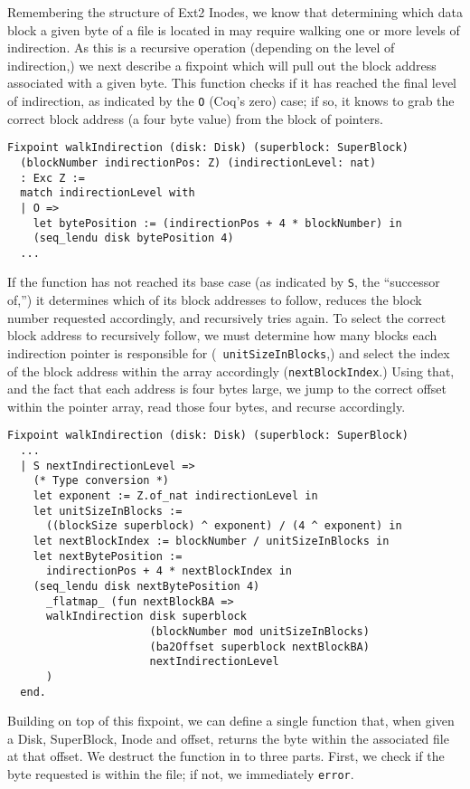 \documentclass[nocopyrightspace]{sigplanconf}
\begin{document}
Remembering the structure of Ext2 Inodes, we know that determining which data
block a given byte of a file is located in may require walking one or more
levels of indirection. As this is a recursive operation (depending on the
level of indirection,) we next describe a fixpoint which will pull out the
block address associated with a given byte. This function checks if it has
reached the final level of indirection, as indicated by the {\tt O} (Coq's
zero) case; if so, it knows to grab the correct block address (a four byte
value) from the block of pointers.

\begin{lstlisting}
Fixpoint walkIndirection (disk: Disk) (superblock: SuperBlock)
  (blockNumber indirectionPos: Z) (indirectionLevel: nat) 
  : Exc Z :=
  match indirectionLevel with
  | O => 
    let bytePosition := (indirectionPos + 4 * blockNumber) in
    (seq_lendu disk bytePosition 4)
  ...
\end{lstlisting}

If the function has not reached its base case (as indicated by {\tt S}, the
``successor of,'') it determines which of its block addresses to follow,
reduces the block number requested accordingly, and recursively tries again.
To select the correct block address to recursively follow, we must determine
how many blocks each indirection pointer is responsible for ({\tt
unitSizeInBlocks},) and select the index of the block address within the array
accordingly ({\tt nextBlockIndex}.) Using that, and the fact that each address
is four bytes large, we jump to the correct offset within the pointer array,
read those four bytes, and recurse accordingly.

\begin{lstlisting}
Fixpoint walkIndirection (disk: Disk) (superblock: SuperBlock)
  ...
  | S nextIndirectionLevel =>
    (* Type conversion *)
    let exponent := Z.of_nat indirectionLevel in
    let unitSizeInBlocks := 
      ((blockSize superblock) ^ exponent) / (4 ^ exponent) in
    let nextBlockIndex := blockNumber / unitSizeInBlocks in
    let nextBytePosition := 
      indirectionPos + 4 * nextBlockIndex in
    (seq_lendu disk nextBytePosition 4) 
      _flatmap_ (fun nextBlockBA =>
      walkIndirection disk superblock 
                      (blockNumber mod unitSizeInBlocks)
                      (ba2Offset superblock nextBlockBA)
                      nextIndirectionLevel
      )
  end.
\end{lstlisting}

Building on top of this fixpoint, we can define a single function that, when
given a Disk, SuperBlock, Inode and offset, returns the byte within the
associated file at that offset. We destruct the function in to three parts.
First, we check if the byte requested is within the file; if not, we
immediately {\tt error}.
\end{document}
